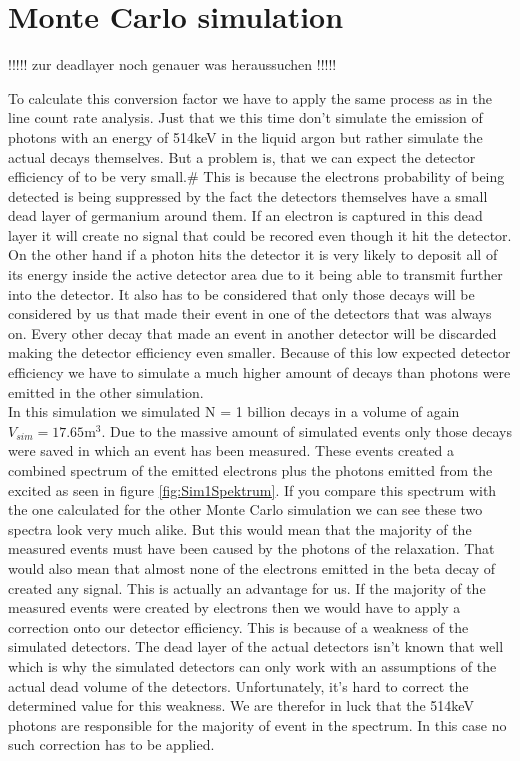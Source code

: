 \section{Monte Carlo simulation}
\label{sec:MonteCarlo2}


!!!!! zur deadlayer noch genauer was heraussuchen !!!!!

To calculate this conversion factor we have to apply the same process as in the line count rate analysis.
Just that we this time don't simulate the emission of photons with an energy of 514keV in the liquid argon but rather simulate the actual \Kr decays themselves.
But a problem is, that we can expect the detector efficiency of \Kr to be very small.#
This is because the electrons probability of being detected is being suppressed by the fact the detectors themselves have a small dead layer of germanium around them.
If an electron is captured in this dead layer it will create no signal that could be recored even though it hit the detector.
On the other hand if a photon hits the detector it is very likely to deposit all of its energy inside the active detector area due to it being able to transmit further into the detector.
It also has to be considered that only those decays will be considered by us that made their event in one of the detectors that was always on.
Every other decay that made an event in another detector will be discarded making the detector efficiency even smaller. 
Because of this low expected detector efficiency we have to simulate a much higher amount of decays than photons were emitted in the other simulation.
\\

In this simulation we simulated N = 1 billion \Kr decays in a volume of again $V_{sim} = 17.65 \mathrm{m}^3$.
Due to the massive amount of simulated events only those decays were saved in which an event has been measured.
These events created a combined spectrum of the emitted electrons plus the photons emitted from the excited  as seen in figure \ref{fig:Sim1Spektrum}.
If you compare this spectrum with the one calculated for the other Monte Carlo simulation we can see these two spectra look very much alike.
But this would mean that the majority of the measured events must have been caused by the photons of the  relaxation.
That would also mean that almost none of the electrons emitted in the beta decay of \Kr created any signal.
This is actually an advantage for us.
If the majority of the measured events were created by electrons then we would have to apply a correction onto our detector efficiency.
This is because of a weakness of the simulated detectors.
The dead layer of the actual detectors isn't known that well which is why the simulated detectors can only work with an assumptions of the actual dead volume of the detectors.
Unfortunately, it's hard to correct the determined value for this weakness.
We are therefor in luck that the 514keV photons are responsible for the majority of event in the spectrum.
In this case no such correction has to be applied.
\\

